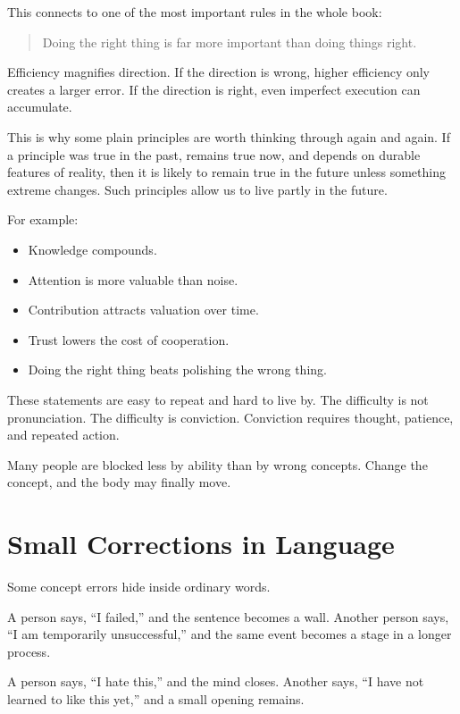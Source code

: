 This connects to one of the most important rules in the whole book:

\begin{quote}
Doing the right thing is far more important than doing things right.
\end{quote}

Efficiency magnifies direction. If the direction is wrong, higher efficiency only creates a larger error. If the direction is right, even imperfect execution can accumulate.

This is why some plain principles are worth thinking through again and again. If a principle was true in the past, remains true now, and depends on durable features of reality, then it is likely to remain true in the future unless something extreme changes. Such principles allow us to live partly in the future.

For example:

\begin{itemize}
\item Knowledge compounds.
\item Attention is more valuable than noise.
\item Contribution attracts valuation over time.
\item Trust lowers the cost of cooperation.
\item Doing the right thing beats polishing the wrong thing.
\end{itemize}

These statements are easy to repeat and hard to live by. The difficulty is not pronunciation. The difficulty is conviction. Conviction requires thought, patience, and repeated action.

Many people are blocked less by ability than by wrong concepts. Change the concept, and the body may finally move.

\section*{Small Corrections in Language}

Some concept errors hide inside ordinary words.

A person says, ``I failed,'' and the sentence becomes a wall. Another person says, ``I am temporarily unsuccessful,'' and the same event becomes a stage in a longer process.

A person says, ``I hate this,'' and the mind closes. Another says, ``I have not learned to like this yet,'' and a small opening remains.

